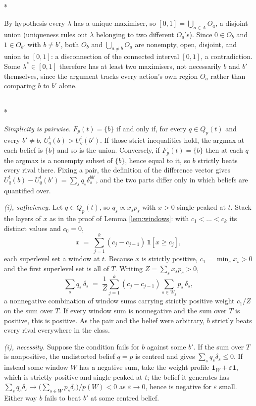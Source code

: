 \documentclass[12pt]{article}
\makeatletter
\theoremstyle{definition}
\renewenvironment{proof}[1][\proofname]{\par
  \pushQED{\qed}%
  \normalfont \topsep6\p@\@plus6\p@\relax
  \trivlist
  \item[\hskip\labelsep\itshape #1\@addpunct{.}]\mbox{}\\*
  \ignorespaces
}{%
  \popQED\endtrivlist\@endpefalse
}
\makeatother
\begin{document}
\begin{proof}[Proof of Proposition \ref{prop:attainedtie}]
By hypothesis every $\lambda$ has a unique maximiser, so $[0,1] = \bigcup_{a \in A} O_a$, a disjoint union (uniqueness rules out $\lambda$ belonging to two different $O_a$'s). Since $0 \in O_b$ and $1 \in O_{b'}$ with $b \neq b'$, both $O_b$ and $\bigcup_{a \neq b} O_a$ are nonempty, open, disjoint, and union to $[0,1]$: a disconnection of the connected interval $[0,1]$, a contradiction. Some $\lambda^* \in [0,1]$ therefore has at least two maximisers, not necessarily $b$ and $b'$ themselves, since the argument tracks every action's own region $O_a$ rather than comparing $b$ to $b'$ alone.
\end{proof}

\begin{proof}[Proof of Theorem \ref{th:dominance}]
\emph{Simplicity is pairwise.} $F_p(t) = \{b\}$ if and only if, for every $q \in Q_p(t)$ and every $b' \neq b$, $U^t_q(b) > U^t_q(b')$. If those strict inequalities hold, the argmax at each belief is $\{b\}$ and so is the union. Conversely, if $F_p(t) = \{b\}$ then at each $q$ the argmax is a nonempty subset of $\{b\}$, hence equal to it, so $b$ strictly beats every rival there. Fixing a pair, the definition of the difference vector gives $U^t_q(b) - U^t_q(b') = \sum_s q_s \delta^{bb'}_s$, and the two parts differ only in which beliefs are quantified over.

\emph{(i), sufficiency.} Let $q \in Q_p(t)$, so $q_s \propto x_s p_s$ with $x > 0$ single-peaked at $t$. Stack the layers of $x$ as in the proof of Lemma \ref{lem:windows}: with $c_1 < \dots < c_k$ its distinct values and $c_0 = 0$,
\[
x \;=\; \sum_{j=1}^{k} (c_j - c_{j-1})\, \mathbf{1}[x \ge c_j],
\]
each superlevel set a window at $t$. Because $x$ is strictly positive, $c_1 = \min_s x_s > 0$ and the first superlevel set is all of $T$. Writing $Z = \sum_s x_s p_s > 0$,
\[
\sum_s q_s\, \delta_s \;=\; \frac{1}{Z} \sum_{j=1}^{k} (c_j - c_{j-1}) \sum_{s \in W_j} p_s\, \delta_s ,
\]
a nonnegative combination of window sums carrying strictly positive weight $c_1/Z$ on the sum over $T$. If every window sum is nonnegative and the sum over $T$ is positive, this is positive. As the pair and the belief were arbitrary, $b$ strictly beats every rival everywhere in the class.

\emph{(i), necessity.} Suppose the condition fails for $b$ against some $b'$. If the sum over $T$ is nonpositive, the undistorted belief $q = p$ is centred and gives $\sum_s q_s \delta_s \le 0$. If instead some window $W$ has a negative sum, take the weight profile $\mathbf{1}_W + \varepsilon \mathbf{1}$, which is strictly positive and single-peaked at $t$; the belief it generates has $\sum_s q_s \delta_s \to \bigl(\sum_{s \in W} p_s \delta_s\bigr)/p(W) < 0$ as $\varepsilon \to 0$, hence is negative for $\varepsilon$ small. Either way $b$ fails to beat $b'$ at some centred belief.


\end{proof}
\end{document}
